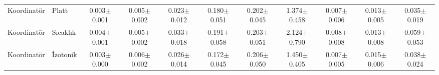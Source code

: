 \begin{table}[t]
\begin{tabular}{@{}ll@{\ }ccccccccc@{}}
Koordinatör & Platt & 0.003$\pm$0.001 & 0.005$\pm$0.002 & 0.023$\pm$0.012 & 0.180$\pm$0.051 & 0.202$\pm$0.045 & 1.374$\pm$0.458 & 0.007$\pm$0.006 & 0.013$\pm$0.005 & 0.035$\pm$0.019 \\
Koordinatör & Sıcaklık & 0.004$\pm$0.001 & 0.005$\pm$0.002 & 0.033$\pm$0.018 & 0.191$\pm$0.058 & 0.203$\pm$0.051 & 2.124$\pm$0.790 & 0.008$\pm$0.008 & 0.013$\pm$0.008 & 0.059$\pm$0.053 \\
Koordinatör & İzotonik & 0.003$\pm$0.000 & 0.006$\pm$0.002 & 0.026$\pm$0.014 & 0.172$\pm$0.045 & 0.206$\pm$0.050 & 1.450$\pm$0.405 & 0.007$\pm$0.005 & 0.015$\pm$0.006 & 0.038$\pm$0.024 \\
\bottomrule
\end{tabular}
\end{table}
